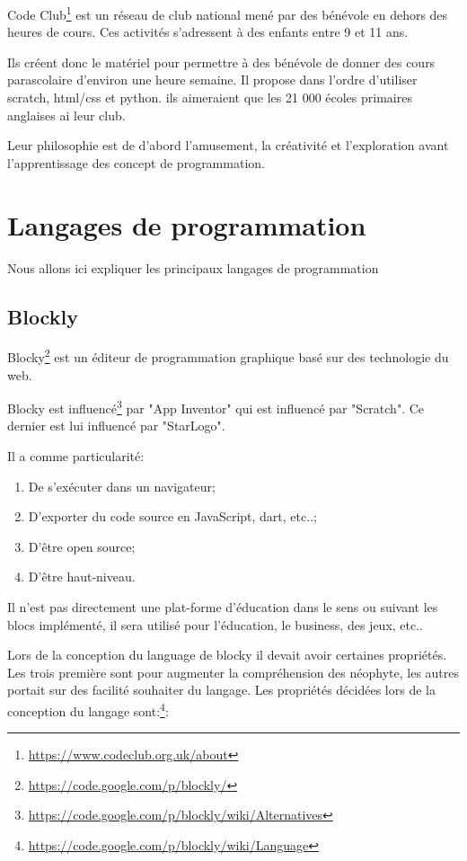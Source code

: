 Code Club\footnote{\url{https://www.codeclub.org.uk/about}} est un réseau de club national mené par des bénévole en dehors des heures de cours. Ces activités s'adressent à des enfants entre 9 et 11 ans.

Ils créent donc le matériel pour permettre à des bénévole de donner des cours parascolaire d'environ une heure semaine. Il propose dans l'ordre d'utiliser scratch, html/css et python. ils aimeraient que les 21 000 écoles primaires anglaises ai leur club.

Leur philosophie est de d'abord l'amusement, la créativité et l'exploration avant l'apprentissage des concept de programmation.

\section{Langages de programmation}
Nous allons ici expliquer les principaux langages de programmation 
\subsection{Blockly}
\label{blockly}
Blocky\footnote{\url{https://code.google.com/p/blockly/}} est un éditeur de programmation graphique basé sur des technologie du web. 

Blocky est influencé\footnote{\url{https://code.google.com/p/blockly/wiki/Alternatives}} par "App Inventor" qui est influencé par "Scratch". Ce dernier est lui influencé par "StarLogo".

Il a comme particularité:
\begin{enumerate}
\item De s'exécuter dans un navigateur;
\item D'exporter du code source en JavaScript, dart, etc..;
\item D'être open source;
\item D'être haut-niveau.
\end{enumerate}

Il n'est pas directement une plat-forme d'éducation dans le sens ou suivant les blocs implémenté, il sera utilisé pour l'éducation, le business, des jeux, etc..


Lors de la conception du language de blocky il devait avoir certaines propriétés. Les trois première sont pour augmenter la compréhension des néophyte, les autres portait sur des facilité souhaiter du langage. Les propriétés décidées lors de la conception du langage sont:\footnote{\url{https://code.google.com/p/blockly/wiki/Language}}:

